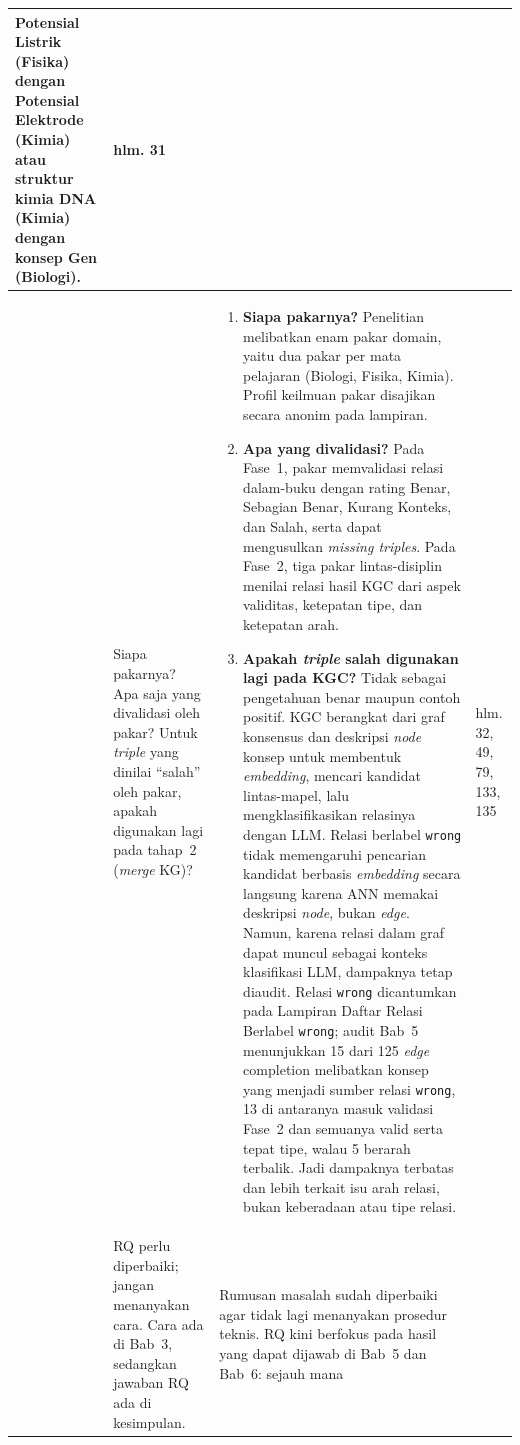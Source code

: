 \documentclass[12pt, a4paper]{article}
\begin{document}
\begin{longtable}{|
  >{\centering\arraybackslash}p{\revisionNoCol}|
  p{\revisionNoteCol}|
  p{\revisionResultCol}|
  >{\centering\arraybackslash}p{\revisionPageCol}|}
Potensial Listrik (Fisika) dengan Potensial Elektrode (Kimia) atau struktur
kimia DNA (Kimia) dengan konsep Gen (Biologi). &
hlm. 31 \\
\hline
5 & Siapa pakarnya? Apa saja yang divalidasi oleh pakar? Untuk \textit{triple}
yang dinilai ``salah'' oleh pakar, apakah digunakan lagi pada tahap~2
(\textit{merge} KG)? &
\begin{enumerate}[leftmargin=1.1em, itemsep=1pt, parsep=0pt, topsep=0pt]
  \item \textbf{Siapa pakarnya?} Penelitian melibatkan enam pakar domain, yaitu
        dua pakar per mata pelajaran (Biologi, Fisika, Kimia). Profil
        keilmuan pakar disajikan secara anonim pada lampiran.
  \item \textbf{Apa yang divalidasi?} Pada Fase~1, pakar memvalidasi relasi
        dalam-buku dengan rating Benar, Sebagian Benar, Kurang Konteks, dan
        Salah, serta dapat mengusulkan \textit{missing triples}. Pada Fase~2,
        tiga pakar lintas-disiplin menilai relasi hasil KGC dari aspek
        validitas, ketepatan tipe, dan ketepatan arah.
  \item \textbf{Apakah \textit{triple} salah digunakan lagi pada KGC?} Tidak
        sebagai pengetahuan benar maupun contoh positif. KGC berangkat dari
        graf konsensus dan deskripsi \textit{node} konsep untuk membentuk
        \textit{embedding}, mencari kandidat lintas-mapel, lalu
        mengklasifikasikan relasinya dengan LLM. Relasi berlabel
        \texttt{wrong} tidak memengaruhi pencarian kandidat berbasis
        \textit{embedding} secara langsung karena ANN memakai deskripsi
        \textit{node}, bukan \textit{edge}. Namun, karena relasi dalam graf
        dapat muncul sebagai konteks klasifikasi LLM, dampaknya tetap diaudit.
        Relasi \texttt{wrong} dicantumkan pada Lampiran Daftar Relasi Berlabel
        \texttt{wrong}; audit Bab~5 menunjukkan 15 dari 125 \textit{edge}
        completion melibatkan konsep yang menjadi sumber relasi \texttt{wrong},
        13 di antaranya masuk validasi Fase~2 dan semuanya valid serta tepat
        tipe, walau 5 berarah terbalik. Jadi dampaknya terbatas dan lebih
        terkait isu arah relasi, bukan keberadaan atau tipe relasi.
\end{enumerate} &
hlm. 32, 49, 79, 133, 135 \\
\hline
6 & RQ perlu diperbaiki; jangan menanyakan cara. Cara ada di Bab~3, sedangkan
jawaban RQ ada di kesimpulan. &
Rumusan masalah sudah diperbaiki agar tidak lagi menanyakan prosedur teknis.
RQ kini berfokus pada hasil yang dapat dijawab di Bab~5 dan Bab~6: sejauh mana

\end{longtable}
\end{document}
